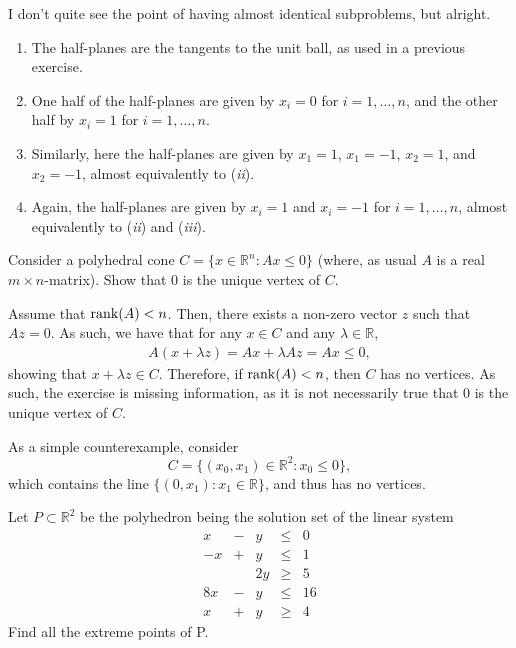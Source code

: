 \documentclass[
  a4paper,
  12pt,
]{article}
\numberwithin{equation}{section}
\begin{document}
\begin{solution}
  I don't quite see the point of having almost identical subproblems, but alright.
  \begin{enumerate}[label = (\emph{\roman*})]
    \item The half-planes are the tangents to the unit ball, as used in a previous exercise.
    \item One half of the half-planes are given by $x_i = 0$ for $i = 1, \ldots, n$, and the other half by $x_i = 1$ for $i = 1, \ldots, n$.
    \item Similarly, here the half-planes are given by $x_1 = 1$, $x_1 = -1$, $x_2 = 1$, and $x_2 = -1$, almost equivalently to (\emph{ii}).
    \item Again, the half-planes are given by $x_i = 1$ and $x_i = -1$ for $i = 1, \ldots, n$, almost equivalently to (\emph{ii}) and (\emph{iii}).
  \end{enumerate}
\end{solution}

\setcounter{section}{4}

\begin{exercise}
  Consider a polyhedral cone $C = \{x \in \mathbb{R}^n : Ax \leq 0\}$ (where, as usual $A$ is a real $m \times n$-matrix).
  Show that $0$ is the unique vertex of $C$.
\end{exercise}

\begin{solution}
  Assume that $\operatorname*{rank}(A) < n$.
  Then, there exists a non-zero vector $z$ such that $Az = 0$.
  As such, we have that for any $x \in C$ and any $\lambda \in \mathbb{R}$,
  \begin{align*}
    A(x + \lambda z) = Ax + \lambda Az = Ax \leq 0,
  \end{align*}
  showing that $x + \lambda z \in C$.
  Therefore, if $\operatorname*{rank}(A) < n$, then $C$ has no vertices.
  As such, the exercise is missing information, as it is not necessarily true that $0$ is the unique vertex of $C$.

  As a simple counterexample, consider
  \begin{equation}
    C = \{ (x_0, x_1) \in \mathbb{R}^2 : x_0 \leq 0 \},
  \end{equation}
  which contains the line $\{ (0, x_1) : x_1 \in \mathbb{R} \}$, and thus has no vertices.
\end{solution}


\begin{exercise}
  Let $P \subset \mathbb{R}^2$ be the polyhedron being the solution set of the linear system
  \begin{equation}
    \begin{array}{rcrcl}
      x & - & y & \leq & 0 \\
      -x & + & y & \leq & 1 \\
      & & 2y & \geq & 5 \\
      8x & - & y & \leq & 16 \\
      x & + & y & \geq & 4
    \end{array}
  \end{equation}
  Find all the extreme points of P.
\end{exercise}
\end{document}
